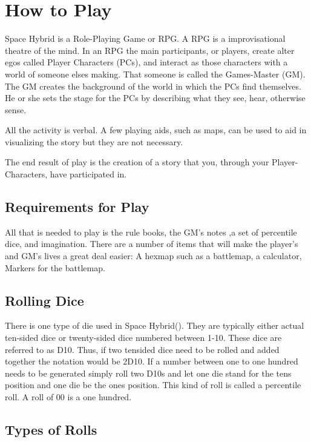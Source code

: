 \chapter{How to Play}

Space Hybrid is a Role-Playing Game or RPG. A RPG is a improvisational theatre 
of the mind. In an RPG the main participants, or players, create alter egos called
Player Characters (PCs), and interact as those characters with a world of someone
elses making. That someone is called the Games-Master (GM). The GM creates the 
background of the world in which the PCs find themselves. He or she sets 
the stage for the PCs by describing what they see, hear, otherwise sense. 

All the activity is verbal. A few playing aids, such as maps, can be used 
to aid in visualizing the story but they are not necessary. 

The end result of play is the creation of a story that you, through
your Player-Characters, have participated in. 

\section{Requirements for Play}

All that is needed to play is the rule books, the GM's notes 
,a set of percentile dice, and imagination. There are a number of items that 
will make the player's and GM's lives a great deal easier: 
A hexmap such as a battlemap, a calculator, Markers for the battlemap.

\section{Rolling Dice}

There is one type of die used in Space Hybrid(\SH). They are
typically either actual ten-sided dice or twenty-sided dice 
numbered between 1-10. These dice are referred to as D10. Thus,
if two tensided dice need to be rolled and added together the 
notation would be 2D10. If a number between one to one hundred needs
to be generated simply roll two D10s and let one die stand for the 
tens position and one die be the ones position. This kind of roll is 
called a percentile roll. A roll of 00 is a one hundred. 

\section{Types of Rolls}


